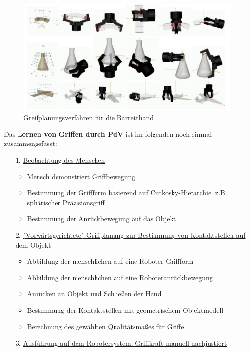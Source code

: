 \begin{figure}[ht]\centering 
\includegraphics[width=0.5\linewidth]{figures/ch04_griffe.png}
\caption{Greifplanungsverfahren für die Barretthand}
\label{fig:ch04_griffe}
\end{figure}
\noindent
Das \textbf{Lernen von Griffen durch PdV} ist im folgenden noch einmal zusammengefasst:
\begin{itemize}
\item[1.] \underline{Beobachtung des Menschen}
\begin{itemize}
\item Mensch demonstriert Griffbewegung
\item Bestimmung der Griffform basierend auf Cutkosky-Hierarchie, z.B. sphärischer Präzisionsgriff
\item Bestimmung der Anrückbewegung auf das Objekt
\end{itemize} 
\item[2.] \underline{(Vorwärtsgerichtete) Griffplanung zur Bestimmung von Kontaktstellen auf dem Objekt}
\begin{itemize}
\item Abbildung der menschlichen auf eine Roboter-Griffform
\item Abbildung der menschlichen auf eine Roboteranrückbewegung
\item Anrücken an Objekt und Schließen der Hand
\item Bestimmung der Kontaktstellen mit geometrischem Objektmodell
\item Berechnung des gewählten Qualitätsmaßes für Griffe
\end{itemize}
\item[3.] \underline{Ausführung auf dem Robotersystem: Griffkraft manuell nachjustiert}
\end{itemize}